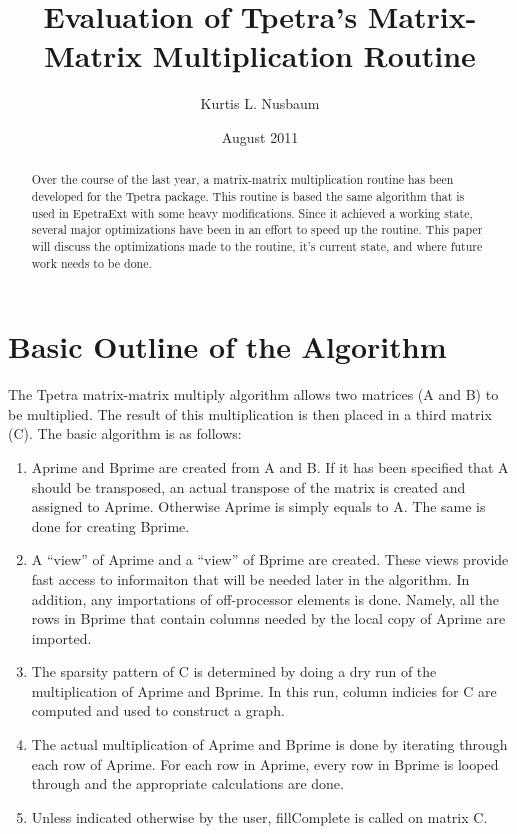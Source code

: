 \documentclass{article}
\title{Evaluation of Tpetra's Matrix-Matrix Multiplication Routine}
\author{Kurtis L. Nusbaum}
\date{August 2011}
\begin{document}
\maketitle

\begin{abstract}
Over the course of the last year, a matrix-matrix multiplication routine has been developed for the Tpetra package.
This routine is based the same algorithm that is used in EpetraExt with some heavy modifications. Since it 
achieved a working state, several major optimizations have been in an effort to speed up the routine. This paper will
discuss the optimizations made to the routine, it's current state, and where future work needs to be done.
\end{abstract}
\clearpage
\tableofcontents
\clearpage

\section{Basic Outline of the Algorithm}
The Tpetra matrix-matrix multiply algorithm allows two matrices (A and B) to be multiplied. The result of this 
multiplication is then placed in a third matrix (C).
The basic algorithm is as follows:
\begin{enumerate}
  \item Aprime and Bprime are created from A and B. If it has been specified that A should be transposed, an actual 
  transpose of the matrix is created and assigned to Aprime. Otherwise Aprime is simply equals to A. The same is done for 
  creating Bprime.
  \item A ``view'' of Aprime and a ``view'' of Bprime are created. These views provide fast access to informaiton that 
  will be needed later in the algorithm. In addition, any importations of off-processor elements is done. Namely, all the 
  rows in Bprime that contain columns needed by the local copy of Aprime are imported.
  \item The sparsity pattern of C is determined by doing a dry run of the multiplication of Aprime and Bprime. In this run, 
  column indicies for C are computed and used to construct a graph.
  \item The actual multiplication of Aprime and Bprime is done by iterating through each row of Aprime. For each row in 
  Aprime, every row in Bprime is looped through and the appropriate calculations are done.
  \item Unless indicated otherwise by the user, fillComplete is called on matrix C.
\end{enumerate}
\end{document}
